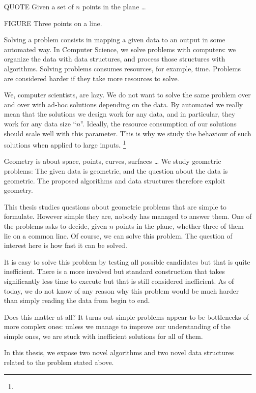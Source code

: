 

QUOTE Given a set of \(n\) points in the plane \dots

FIGURE Three points on a line.

Solving a problem consists in mapping a given data to an output in some
automated way.
In Computer Science, we solve problems with computers: we organize the data
with data structures, and process those structures with algorithms.
%
Solving problems consumes resources, for example, time.
Problems are considered harder if they take more resources to solve.

We, computer scientists, are lazy. We do not want to solve the same problem
over and over with ad-hoc solutions depending on the data.
%
By automated we really mean that the solutions we
design work for any data, and in particular, they work for any data size
``\(n\)''.
%
Ideally, the resource consumption of our solutions should scale well with this
parameter.
%
This is why we study the behaviour of such solutions when applied to large
inputs.%
\footnote{%
}

Geometry is about space, points, curves, surfaces \dots
We study geometric problems:
%
The given data is geometric, and the question about the data is geometric.
The proposed algorithms and data structures therefore exploit geometry.

This thesis studies questions about geometric problems that are simple to
formulate. However simple they are, nobody
has managed to answer them. One of the problems asks to decide, given \(n\) points in the plane,
whether three of them lie on a common line. Of course, we can solve this
problem. The question of interest here is how fast it can be solved.

It is easy to solve this problem by testing all possible candidates but that is
quite inefficient. There is a
more involved but standard construction that takes significantly less time to
execute but that is still considered inefficient. As of today, we do not know of
any reason why this problem would be much harder than simply
reading the data from begin to end.

Does this matter at all? It turns out simple problems appear to
be bottlenecks of more complex ones: unless we manage to improve our
understanding of the simple ones, we are stuck with inefficient solutions for
all of them.

In this thesis, we expose two novel algorithms and two novel data
structures related to the problem stated above.
